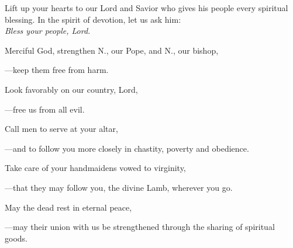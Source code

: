 \intercessions\indent

\begin{hangpar}

Lift up your hearts to our Lord and Savior who gives his people every spiritual blessing. In the spirit of devotion, let us ask him:\\
\emph{Bless your people, Lord.}

\medskip Merciful God, strengthen N., our Pope, and N., our bishop,

{\color{red}---\thinspace}keep them free from harm.

\medskip Look favorably on our country, Lord,

{\color{red}---\thinspace}free us from all evil.

\medskip Call men to serve at your altar,

{\color{red}---\thinspace}and to follow you more closely in chastity, poverty and obedience.

\medskip Take care of your handmaidens vowed to virginity,

{\color{red}---\thinspace}that they may follow you, the divine Lamb, wherever you go.

\medskip May the dead rest in eternal peace,

{\color{red}---\thinspace}may their union with us be strengthened through the sharing of spiritual goods.

\end{hangpar}

